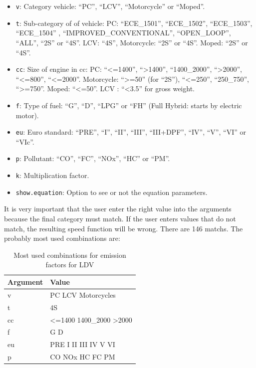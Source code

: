 \documentclass[12pt,graybox,envcountchap,sectrefs]{krantz}
\providecommand{\tightlist}{%
  \setlength{\itemsep}{0pt}\setlength{\parskip}{0pt}}
\theoremstyle{definition}
\theoremstyle{definition}
\theoremstyle{definition}
\theoremstyle{remark}
\begin{document}
\begin{itemize}
\tightlist
\item
  \texttt{v}: Category vehicle: ``PC'', ``LCV'', ``Motorcycle'' or
  ``Moped''.
\item
  \texttt{t}: Sub-category of of vehicle: PC: ``ECE\_1501'',
  ``ECE\_1502'', ``ECE\_1503'', ``ECE\_1504'' ,
  ``IMPROVED\_CONVENTIONAL'', ``OPEN\_LOOP'', ``ALL'', ``2S'' or ``4S''.
  LCV: ``4S'', Motorcycle: ``2S'' or ``4S''. Moped: ``2S'' or ``4S''.
\item
  \texttt{cc}: Size of engine in cc: PC: ``\textless{}=1400'',
  ``\textgreater{}1400'', ``1400\_2000'', ``\textgreater{}2000'',
  ``\textless{}=800'', ``\textless{}=2000''. Motorcycle:
  ``\textgreater{}=50'' (for ``2S''), ``\textless{}=250'', ``250\_750'',
  ``\textgreater{}=750''. Moped: ``\textless{}=50''. LCV :
  ``\textless{}3.5'' for gross weight.
\item
  \texttt{f}: Type of fuel: ``G'', ``D'', ``LPG'' or ``FH'' (Full
  Hybrid: starts by electric motor).
\item
  \texttt{eu}: Euro standard: ``PRE'', ``I'', ``II'', ``III'',
  ``III+DPF'', ``IV'', ``V'', ``VI'' or ``VIc''.
\item
  \texttt{p}: Pollutant: ``CO'', ``FC'', ``NOx'', ``HC'' or ``PM''.
\item
  \texttt{k}: Multiplication factor.
\item
  \texttt{show.equation}: Option to see or not the equation parameters.
\end{itemize}

It is very important that the user enter the right value into the
arguments because the final category must match. If the user enters
values that do not match, the resulting speed function will be wrong.
There are 146 matchs. The probably most used combinations are:

\begin{table}

\caption{\label{tab:unnamed-chunk-51}Most used combinations for emission factors for LDV}
\centering
\begin{tabular}[t]{ll}
\toprule
Argument & Value\\
\midrule
v & PC LCV Motorcycles\\
t & 4S\\
cc & <=1400 1400\_2000 >2000\\
f & G D\\
eu & PRE I II III IV V VI\\
p & CO NOx HC FC PM\\
\bottomrule
\end{tabular}
\end{table}
\end{document}
